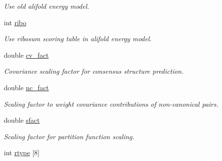 \begin{DoxyCompactItemize}
\begin{DoxyCompactList}\small\item\em Use old alifold energy model. \end{DoxyCompactList}\item 
int \hyperlink{group__model__details_a3df2ae4bd9c133ef8ab92a53b1d035ec}{ribo}\hypertarget{group__model__details_a3df2ae4bd9c133ef8ab92a53b1d035ec}{}\label{group__model__details_a3df2ae4bd9c133ef8ab92a53b1d035ec}

\begin{DoxyCompactList}\small\item\em Use ribosum scoring table in alifold energy model. \end{DoxyCompactList}\item 
double \hyperlink{group__model__details_a62ebefb9d0643e5c4c8a2ec84a105ce6}{cv\+\_\+fact}\hypertarget{group__model__details_a62ebefb9d0643e5c4c8a2ec84a105ce6}{}\label{group__model__details_a62ebefb9d0643e5c4c8a2ec84a105ce6}

\begin{DoxyCompactList}\small\item\em Covariance scaling factor for consensus structure prediction. \end{DoxyCompactList}\item 
double \hyperlink{group__model__details_abcf568e6124bfcb2f847ff4eb0dfded6}{nc\+\_\+fact}\hypertarget{group__model__details_abcf568e6124bfcb2f847ff4eb0dfded6}{}\label{group__model__details_abcf568e6124bfcb2f847ff4eb0dfded6}

\begin{DoxyCompactList}\small\item\em Scaling factor to weight covariance contributions of non-\/canonical pairs. \end{DoxyCompactList}\item 
double \hyperlink{group__model__details_ab6f4cabaa9b4726b13592486d5bc21c7}{sfact}\hypertarget{group__model__details_ab6f4cabaa9b4726b13592486d5bc21c7}{}\label{group__model__details_ab6f4cabaa9b4726b13592486d5bc21c7}

\begin{DoxyCompactList}\small\item\em Scaling factor for partition function scaling. \end{DoxyCompactList}\item 
int \hyperlink{group__model__details_ad082d0fea31e002b90cdfe5e6382f8b0}{rtype} \mbox{[}8\mbox{]}\hypertarget{group__model__details_ad082d0fea31e002b90cdfe5e6382f8b0}{}\label{group__model__details_ad082d0fea31e002b90cdfe5e6382f8b0}


\end{DoxyCompactItemize}
